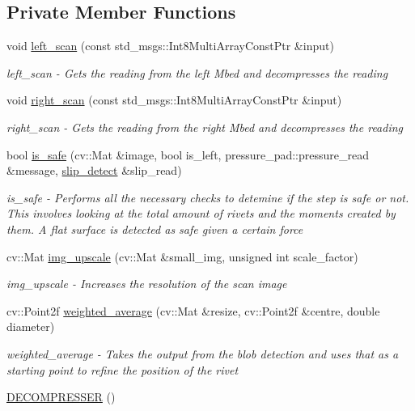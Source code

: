 \subsection*{Private Member Functions}
\begin{DoxyCompactItemize}
\item 
void \hyperlink{class_d_e_c_o_m_p_r_e_s_s_e_r_a974bdbaca3c74f44fb9578a2495e5434}{left\-\_\-scan} (const std\-\_\-msgs\-::\-Int8\-Multi\-Array\-Const\-Ptr \&input)
\begin{DoxyCompactList}\small\item\em left\-\_\-scan -\/ Gets the reading from the left Mbed and decompresses the reading \end{DoxyCompactList}\item 
void \hyperlink{class_d_e_c_o_m_p_r_e_s_s_e_r_a9409df1493e7a1b2841466304611d361}{right\-\_\-scan} (const std\-\_\-msgs\-::\-Int8\-Multi\-Array\-Const\-Ptr \&input)
\begin{DoxyCompactList}\small\item\em right\-\_\-scan -\/ Gets the reading from the right Mbed and decompresses the reading \end{DoxyCompactList}\item 
bool \hyperlink{class_d_e_c_o_m_p_r_e_s_s_e_r_a8c30f402301b111e9c3f6efa721c926b}{is\-\_\-safe} (cv\-::\-Mat \&image, bool is\-\_\-left, pressure\-\_\-pad\-::pressure\-\_\-read \&message, \hyperlink{classslip__detect}{slip\-\_\-detect} \&slip\-\_\-read)
\begin{DoxyCompactList}\small\item\em is\-\_\-safe -\/ Performs all the necessary checks to detemine if the step is safe or not. This involves looking at the total amount of rivets and the moments created by them. A flat surface is detected as safe given a certain force \end{DoxyCompactList}\item 
cv\-::\-Mat \hyperlink{class_d_e_c_o_m_p_r_e_s_s_e_r_ad2aadf38da0d144f527bf35779a02c71}{img\-\_\-upscale} (cv\-::\-Mat \&small\-\_\-img, unsigned int scale\-\_\-factor)
\begin{DoxyCompactList}\small\item\em img\-\_\-upscale -\/ Increases the resolution of the scan image \end{DoxyCompactList}\item 
cv\-::\-Point2f \hyperlink{class_d_e_c_o_m_p_r_e_s_s_e_r_a3c48b98dde806c63dfd8524792127d8e}{weighted\-\_\-average} (cv\-::\-Mat \&resize, cv\-::\-Point2f \&centre, double diameter)
\begin{DoxyCompactList}\small\item\em weighted\-\_\-average -\/ Takes the output from the blob detection and uses that as a starting point to refine the position of the rivet \end{DoxyCompactList}\item 
\hyperlink{class_d_e_c_o_m_p_r_e_s_s_e_r_a79c0d624a360aa25f2dfd0a3e4d8d478}{D\-E\-C\-O\-M\-P\-R\-E\-S\-S\-E\-R} ()
\end{DoxyCompactItemize}
